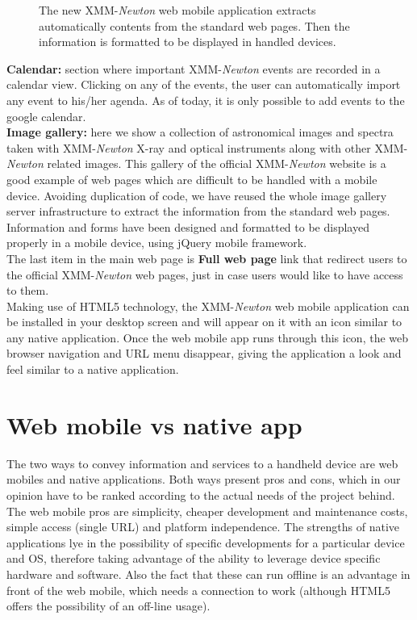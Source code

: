 \begin{figure}[h]
\caption{ The new XMM-{\em Newton} web mobile application extracts automatically
contents from the standard web pages. Then the information is formatted
to be displayed in handled devices.} \label{P061-fig-1}
\end{figure}


{\bf Calendar:} section where important XMM-{\em Newton} events are recorded in a
calendar view. Clicking on any of the events, the user can
automatically import any event to his/her agenda. As of today, it is
only possible to add events to the google calendar. \\

{\bf Image gallery:} here we show a collection of astronomical images
and spectra taken with XMM-{\em Newton} X-ray and optical instruments along with
other XMM-{\em Newton} related images. This gallery of the official XMM-{\em Newton}
website is a good example of web pages which are difficult to be
handled with a mobile device. Avoiding duplication of code, we have
reused the whole image gallery server infrastructure to extract the
information from the standard web pages.  Information and forms have
been designed and formatted to be displayed properly in a mobile
device, using jQuery mobile framework.\\

The last item in the main web page is {\bf Full web page} link that
redirect users to the official XMM-{\em Newton} web pages, just in case users would
like to have access to them. \\

Making use of HTML5 technology, the XMM-{\em Newton} web mobile application can be
installed in your desktop screen and will appear on it with an icon
similar to any native application. Once the web mobile app runs
through this icon, the web browser navigation and URL menu disappear,
giving the application a look and feel similar to a native
application.

\section{Web mobile vs native app}

The two ways to convey information and services to a handheld device
are web mobiles and native applications. Both ways present pros and
cons, which in our opinion have to be ranked according to the actual
needs of the project behind. The web mobile pros are simplicity,
cheaper development and maintenance costs, simple access (single URL)
and platform independence. The strengths of native applications lye in
the possibility of specific developments for a particular device and
OS, therefore taking advantage of the ability to leverage device
specific hardware and software. Also the fact that these can run
offline is an advantage in front of the web mobile, which needs a
connection to work (although HTML5 offers the possibility of an
off-line usage).\\


